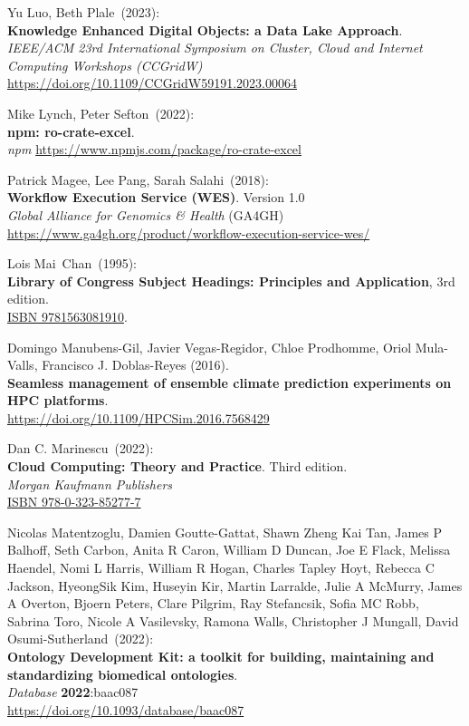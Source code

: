 \begin{thebibliography}{9}
Yu Luo, Beth Plale~(2023): \\
\textbf{Knowledge Enhanced Digital Objects: a Data Lake Approach}.\\
\emph{IEEE/ACM 23rd International Symposium on Cluster, Cloud and Internet Computing Workshops (CCGridW)}\\
\url{https://doi.org/10.1109/CCGridW59191.2023.00064}

Mike Lynch, Peter Sefton~(2022): \\
\textbf{npm: ro-crate-excel}.\\
\emph{npm} \url{https://www.npmjs.com/package/ro-crate-excel}

Patrick Magee, Lee Pang, Sarah Salahi~(2018): \\
\textbf{Workflow Execution Service (WES)}. Version 1.0\\
\emph{Global Alliance for Genomics \& Health} (GA4GH)\\
\url{https://www.ga4gh.org/product/workflow-execution-service-wes/}

Lois Mai~Chan~(1995): \\
\textbf{Library of Congress Subject Headings: Principles and Application}, 3rd edition.\\
\href{https://identifiers.org/isbn/9781563081910}{ISBN 9781563081910}.

Domingo Manubens-Gil, Javier Vegas-Regidor, Chloe Prodhomme, Oriol Mula-Valls, Francisco J. Doblas-Reyes (2016).\\
\textbf{Seamless management of ensemble climate prediction experiments on HPC platforms}.\\
\url{https://doi.org/10.1109/HPCSim.2016.7568429}

Dan C. Marinescu~(2022): \\
\textbf{Cloud Computing: Theory and Practice}.
Third edition.\\
\emph{Morgan Kaufmann Publishers}\\
\href{https://identifiers.org/isbn/9780323852777}{ISBN 978-0-323-85277-7}

Nicolas Matentzoglu, Damien Goutte-Gattat, Shawn Zheng Kai Tan, James P Balhoff, Seth Carbon, Anita R Caron, William D Duncan, Joe E Flack, Melissa Haendel, Nomi L Harris, William R Hogan, Charles Tapley Hoyt, Rebecca C Jackson, HyeongSik Kim, Huseyin Kir, Martin Larralde, Julie A McMurry, James A Overton, Bjoern Peters, Clare Pilgrim, Ray Stefancsik, Sofia MC Robb, Sabrina Toro, Nicole A Vasilevsky, Ramona Walls, Christopher J Mungall, David Osumi-Sutherland~(2022): \\
\textbf{Ontology Development Kit: a toolkit for building, maintaining and standardizing biomedical ontologies}.\\
\emph{Database} \textbf{2022}:baac087 \\
\url{https://doi.org/10.1093/database/baac087}


\end{thebibliography}

